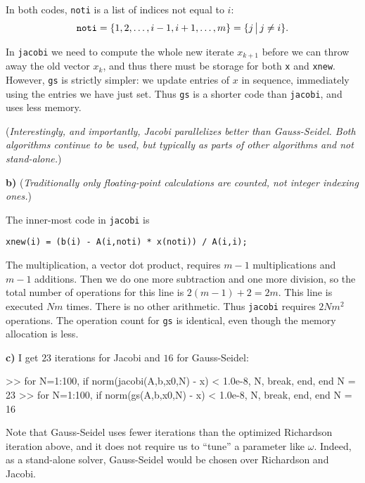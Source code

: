 \documentclass[11pt]{amsart}
\newcommand{\mfile}[2]{
\bigskip
\begin{quote}
\medskip
\VerbatimInput[frame=single,framesep=3mm,label=\fbox{\normalsize \textsl{\,#1\,}},fontfamily=courier,fontsize=\scriptsize]{#2}
\medskip
\end{quote}
}
\newcommand{\epart}[1]{\medskip\noindent\textbf{#1)}}
\begin{document}
\mfile{jacobi.m}{jacobi.m.strip}

\mfile{gs.m}{gs.m.strip}

In both codes, \texttt{noti} is a list of indices not equal to $i$:
    $$\text{\texttt{noti}} = \{1,2,\dots,i-1,i+1,\dots,m\} = \{j\,\big|\,j\neq i\}.$$

In \texttt{jacobi} we need to compute the whole new iterate $x_{k+1}$ before we can throw away the old vector $x_k$, and thus there must be storage for both \texttt{x} and \texttt{xnew}.  However, \texttt{gs} is strictly simpler: we update entries of $x$ in sequence, immediately using the entries we have just set.  Thus \texttt{gs} is a shorter code than \texttt{jacobi}, and uses less memory.

(\emph{Interestingly, and importantly, Jacobi \emph{parallelizes} better than Gauss-Seidel.  Both algorithms continue to be used, but typically as parts of other algorithms and not stand-alone.})


\epart{b}  (\emph{Traditionally only floating-point calculations are counted, not integer indexing ones.})

The inner-most code in \texttt{jacobi} is

\begin{center}
\verb|xnew(i) = (b(i) - A(i,noti) * x(noti)) / A(i,i);|
\end{center}

\noindent The multiplication, a vector dot product, requires $m-1$ multiplications and $m-1$ additions.  Then we do one more subtraction and one more division, so the total number of operations for this line is $2(m-1)+2 = 2m$.  This line is executed $Nm$ times.  There is no other arithmetic.  Thus \texttt{jacobi} requires $2Nm^2$ operations.  The operation count for \texttt{gs} is identical, even though the memory allocation is less.

\epart{c}  I get $23$ iterations for Jacobi and $16$ for Gauss-Seidel:
\begin{mVerb}
>> for N=1:100, if norm(jacobi(A,b,x0,N) - x) < 1.0e-8, N, break, end, end
N =                   23
>> for N=1:100, if norm(gs(A,b,x0,N) - x) < 1.0e-8, N, break, end, end
N =                   16
\end{mVerb}

Note that Gauss-Seidel uses fewer iterations than the optimized Richardson iteration above, and it does not require us to ``tune'' a parameter like $\omega$.  Indeed, as a stand-alone solver, Gauss-Seidel would be chosen over Richardson and Jacobi.
\end{document}
